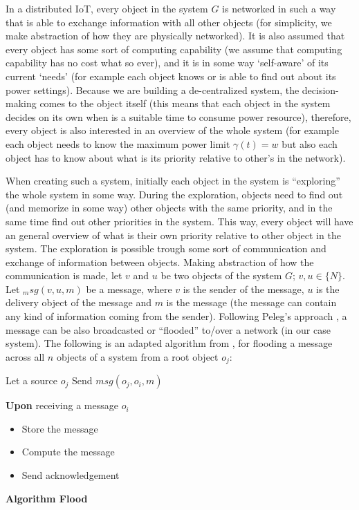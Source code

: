 \documentclass[../main/Self-Stabilization.tex]{subfiles}
\begin{document}
In a distributed IoT, every object in the system $G$ is networked in such a way that is able to exchange information with all other objects (for simplicity, we make abstraction of how they are physically networked). It is also assumed that every object has some sort of computing capability (we assume that computing capability has no cost what so ever), and it is in some way `self-aware' of its current `needs' (for example each object knows or is able to find out about its power settings). Because we are building a de-centralized system, the decision-making comes to the object itself (this means that each object in the system decides on its own when is a suitable time to consume power resource), therefore, every object is also interested in an overview of the whole system (for example each object needs to know the maximum power limit $\gamma(t)= w$ but also each object has to know about what is its priority relative to other's in the network).

When creating such a system, initially each object in the system is ``exploring'' the whole system in some way. During the exploration, objects need to find out (and memorize in some way) other objects with the same priority, and in the same time find out other priorities in the system. This way, every object will have an general overview of what is their own priority relative to other object in the system. The exploration is possible trough some sort of communication and exchange of information between objects. Making abstraction of how the communication is made, let $v$ and $u$ be two objects of the system $G$; $v,u \in\{N\}$. Let $_msg(v,u,m)$ be a message, where $v$ is the sender of the message, $u$ is the delivery object of the message and $m$ is the message (the message can contain any kind of information coming from the sender). Following Peleg's approach \cite{peleg2000distributed}, a message can be also broadcasted or ``flooded'' to/over a network (in our case system). The following is an adapted algorithm from \cite{peleg2000distributed}, for flooding a message across all $n$ objects of a system from a root object $o_{j}$:

\LinesNumbered
\IncMargin{1em}
\begin{algorithm}
Let a source $o_{j}$
\BlankLine
{} {
     {	
        Send \emph{$msg(o_{j},o_{i},m)$}
    }
}
 {

\textbf{Upon} receiving a message $o_{i}$
\begin{itemize}
  \item Store the message
  \item Compute the message
  \item Send acknowledgement
\end{itemize}
}
\caption{\textbf{Algorithm Flood}} \label{flood}
\end{algorithm}
\DecMargin{1em}
\end{document}

